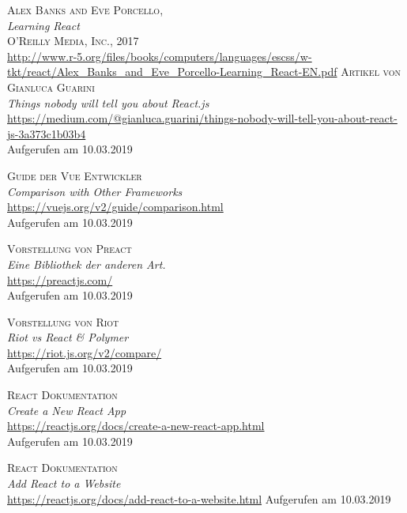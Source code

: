 \documentclass[twoside,12pt,a4paper]{report}
\begin{document}
\begin{thebibliography}{9}
  \textsc{Alex Banks and Eve Porcello}, \\
  \textit{Learning React}\\
  \textsc{O’Reilly Media, Inc., 2017}\\
  \href{http://www.r-5.org/files/books/computers/languages/escss/w-tkt/react/Alex_Banks_and_Eve_Porcello-Learning_React-EN.pdf}{http://www.r-5.org/files/books/computers/languages/escss/w-tkt/react/Alex\_Banks\_and\_Eve\_Porcello-Learning\_React-EN.pdf}
  \textsc{Artikel von Gianluca Guarini}\\
  \textit{Things nobody will tell you about React.js}\\
  \href{https://medium.com/@gianluca.guarini/things-nobody-will-tell-you-about-react-js-3a373c1b03b4}{https://medium.com/@gianluca.guarini/things-nobody-will-tell-you-about-react-js-3a373c1b03b4}\\
  Aufgerufen am 10.03.2019

  \textsc{Guide der Vue Entwickler}\\
  \textit{Comparison with Other Frameworks}\\
  \href{https://vuejs.org/v2/guide/comparison.html}{https://vuejs.org/v2/guide/comparison.html}\\
  Aufgerufen am 10.03.2019

  \textsc{Vorstellung von Preact}\\
  \textit{Eine Bibliothek der anderen Art.}\\
  \href{https://preactjs.com/}{https://preactjs.com/}\\
  Aufgerufen am 10.03.2019

  \textsc{Vorstellung von Riot}\\
  \textit{Riot vs React \& Polymer}\\
  \href{https://riot.js.org/v2/compare/}{https://riot.js.org/v2/compare/}\\
  Aufgerufen am 10.03.2019

  \textsc{React Dokumentation}\\
  \textit{Create a New React App}\\
  \href{https://reactjs.org/docs/create-a-new-react-app.html}{https://reactjs.org/docs/create-a-new-react-app.html}\\
  Aufgerufen am 10.03.2019

  \textsc{React Dokumentation}\\
  \textit{Add React to a Website}\\
  \href{https://reactjs.org/docs/add-react-to-a-website.html}{https://reactjs.org/docs/add-react-to-a-website.html}
  Aufgerufen am 10.03.2019


\end{thebibliography}
\end{document}
